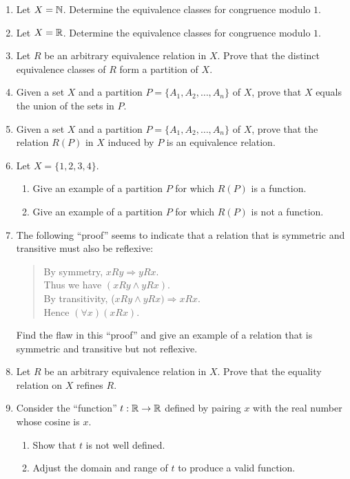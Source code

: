 \begin{enumerate}[{0.}1. ]
\item
Let $X = \mathbb{N}$. Determine the equivalence classes for congruence modulo $1$.

\item
Let $X = \mathbb{R}$. Determine the equivalence classes for congruence modulo $1$.

\item
Let $R$ be an arbitrary equivalence relation in $X$.
Prove that the distinct equivalence classes of $R$ form a partition of $X$.

\item
Given a set $X$ and a partition $P = \{A_1,A_2, \ldots, A_n\}$ of $X$,
prove that $X$ equals the union of the sets in $P$.

\item
Given a set $X$ and a partition $P = \{A_1,A_2, \ldots, A_n\}$ of $X$, prove
that the relation $R(P)$ in $X$ induced by $P$ is an equivalence relation.

\item
Let $X = \{1, 2, 3, 4\}$.
\begin{enumerate}
\item
Give an example of a partition $P$ for which $R(P)$ is a function.
\item
Give an example of a partition $P$ for which $R(P)$ is not a function.
\end{enumerate}

\item
The following ``proof'' seems to indicate that a relation that is
symmetric and transitive must also be reflexive:

\begin{quote}
By symmetry, $x Ry \Rightarrow y Rx$. \\
Thus we have $(xRy \wedge yRx)$. \\
By transitivity, ($x Ry \wedge yRx) \Rightarrow x Rx$.\\
Hence $(\forall x)(x Rx)$.
\end{quote}

Find the flaw in this ``proof'' and give an example of a relation that is
symmetric and transitive but not reflexive.

\item
Let $R$ be an arbitrary equivalence relation in $X$. Prove that the equality
relation on $X$ refines $R$.

\item
Consider the ``function'' $t: \mathbb{R} \rightarrow \mathbb{R}$ defined by pairing $x$ with
the real number whose cosine is $x$.
\begin{enumerate}
\item
Show that $t$ is not well defined.
\item
Adjust the domain and range of $t$ to produce a valid function.
\end{enumerate}


\end{enumerate}
